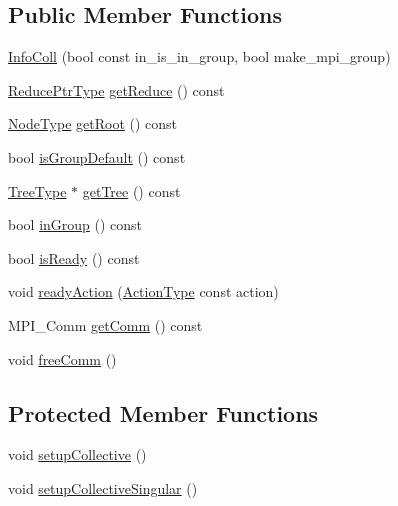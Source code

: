 \subsection*{Public Member Functions}
\begin{DoxyCompactItemize}
\item 
\hyperlink{structvt_1_1group_1_1_info_coll_a289ba2942b64013eabc552e2fe362b0a}{Info\+Coll} (bool const in\+\_\+is\+\_\+in\+\_\+group, bool make\+\_\+mpi\+\_\+group)
\item 
\hyperlink{structvt_1_1group_1_1_info_coll_a1b9fe0214f622ed9e8987531f44ef1fa}{Reduce\+Ptr\+Type} \hyperlink{structvt_1_1group_1_1_info_coll_a297cafe0cae350b83a677db585865e62}{get\+Reduce} () const
\item 
\hyperlink{namespacevt_a866da9d0efc19c0a1ce79e9e492f47e2}{Node\+Type} \hyperlink{structvt_1_1group_1_1_info_coll_a5724786f46add3ccf7ca081774609f0c}{get\+Root} () const
\item 
bool \hyperlink{structvt_1_1group_1_1_info_coll_a6adf605b8d46a4174a8fd1321fd8fd3f}{is\+Group\+Default} () const
\item 
\hyperlink{structvt_1_1group_1_1_info_base_a96e01b6097ed7b2bc299027d0a7a1b1e}{Tree\+Type} $\ast$ \hyperlink{structvt_1_1group_1_1_info_coll_a2e7551dd6e85e5f3a6a7907b70f040c4}{get\+Tree} () const
\item 
bool \hyperlink{structvt_1_1group_1_1_info_coll_a09abdfe4684a0d7997441a97756ea237}{in\+Group} () const
\item 
bool \hyperlink{structvt_1_1group_1_1_info_coll_aec831cf27c5e2492657c5a2209718ae0}{is\+Ready} () const
\item 
void \hyperlink{structvt_1_1group_1_1_info_coll_ad2eb5a689e4b035e51a0a7db9fffd488}{ready\+Action} (\hyperlink{namespacevt_ae0a5a7b18cc99d7b732cb4d44f46b0f3}{Action\+Type} const action)
\item 
M\+P\+I\+\_\+\+Comm \hyperlink{structvt_1_1group_1_1_info_coll_a9f9dfa148d52cdc913fbaf1398f1fb48}{get\+Comm} () const
\item 
void \hyperlink{structvt_1_1group_1_1_info_coll_a0461bfa4ce243b30df15e82f01195ad7}{free\+Comm} ()
\end{DoxyCompactItemize}
\subsection*{Protected Member Functions}
\begin{DoxyCompactItemize}
\item 
void \hyperlink{structvt_1_1group_1_1_info_coll_ad6053b31361b42674c4a72cc076e4636}{setup\+Collective} ()
\item 
void \hyperlink{structvt_1_1group_1_1_info_coll_a89ff0c94d9e1019761d7fb019835621c}{setup\+Collective\+Singular} ()
\end{DoxyCompactItemize}
